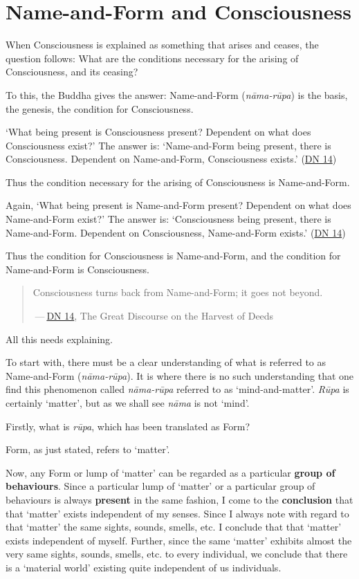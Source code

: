 \chapter{Name-and-Form and Consciousness}

When Consciousness is explained as something that arises and ceases, the question follows: What are the conditions necessary for the arising of Consciousness, and its ceasing?

To this, the Buddha gives the answer: Name-and-Form (\emph{nāma-rūpa}) is the basis, the genesis, the condition for Consciousness.

`What being present is Consciousness present? Dependent on what does Consciousness exist?' The answer is: `Name-and-Form being present, there is Consciousness. Dependent on Name-and-Form, Consciousness exists.' (\href{https://suttacentral.net/dn14/en/sujato}{DN 14})

Thus the condition necessary for the arising of Consciousness is Name-and-Form.

Again, `What being present is Name-and-Form present? Dependent on what does Name-and-Form exist?' The answer is: `Consciousness being present, there is Name-and-Form. Dependent on Consciousness, Name-and-Form exists.' (\href{https://suttacentral.net/dn14/en/sujato}{DN 14})

Thus the condition for Consciousness is Name-and-Form, and the condition for Name-and-Form is Consciousness.

\begin{quote}
Consciousness turns back from Name-and-Form; it goes not beyond.

 --- \href{https://suttacentral.net/dn14/en/sujato}{DN 14}, The Great Discourse on the Harvest of Deeds
\end{quote}

All this needs explaining.

To start with, there must be a clear understanding of what is referred to as Name-and-Form (\emph{nāma-rūpa}). It is where there is no such understanding that one find this phenomenon called \emph{nāma-rūpa} referred to as `mind-and-matter'. \emph{Rūpa} is certainly `matter', but as we shall see \emph{nāma} is not `mind'.

Firstly, what is \emph{rūpa}, which has been translated as Form?

Form, as just stated, refers to `matter'.

Now, any Form or lump of `matter' can be regarded as a particular \textbf{group of behaviours}. Since a particular lump of `matter' or a particular group of behaviours is always \textbf{present} in the same fashion, I come to the \textbf{conclusion} that that `matter' exists independent of my senses. Since I always note with regard to that `matter' the same sights, sounds, smells, etc. I conclude that that `matter' exists independent of myself. Further, since the same `matter' exhibits almost the very same sights, sounds, smells, etc. to every individual, we conclude that there is a `material world' existing quite independent of us individuals.

